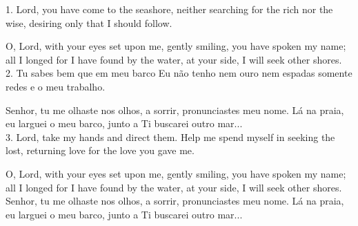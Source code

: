 \documentclass[10pt,a4]{article}
\begin{document}
1. Lord, you have come to the seashore,
neither searching for the rich nor the wise,
desiring only that I should follow.

O, Lord, with your eyes set upon me,
gently smiling, you have spoken my name;
all I longed for I have found by the water,
at your side, I will seek other shores.\\

2. Tu sabes bem que em meu barco
Eu não tenho nem ouro nem espadas
somente redes e o meu trabalho.

Senhor, tu me olhaste nos olhos,
a sorrir, pronunciastes meu nome.
Lá na praia, eu larguei o meu barco,
junto a Ti buscarei outro mar...\\

3. Lord, take my hands and direct them.
Help me spend myself
in seeking the lost,
returning love for the love you gave me.

O, Lord, with your eyes set upon me,
gently smiling, you have spoken my name;
all I longed for I have found by the water,
at your side, I will seek other shores.\\

Senhor, tu me olhaste nos olhos,
a sorrir, pronunciastes meu nome.
Lá na praia, eu larguei o meu barco,
junto a Ti buscarei outro mar...\\
\end{document}
